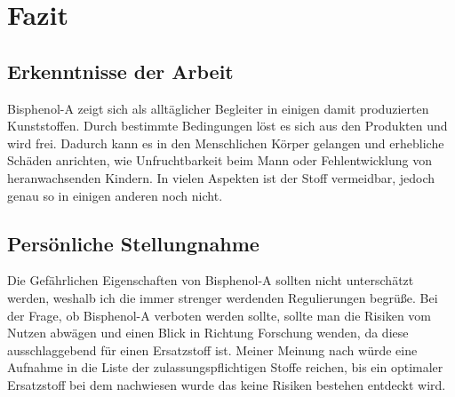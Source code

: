\section{Fazit}
\subsection{Erkenntnisse der Arbeit}
Bisphenol-A zeigt sich als alltäglicher Begleiter in einigen damit produzierten Kunststoffen. Durch bestimmte Bedingungen löst es sich aus den Produkten und wird frei. Dadurch kann es in den Menschlichen Körper gelangen und erhebliche Schäden anrichten, wie Unfruchtbarkeit beim Mann oder Fehlentwicklung von heranwachsenden Kindern. In vielen Aspekten ist der Stoff vermeidbar, jedoch genau so in einigen anderen noch nicht.
\subsection{Persönliche Stellungnahme}
Die Gefährlichen Eigenschaften von Bisphenol-A sollten nicht unterschätzt werden, weshalb ich die immer strenger werdenden Regulierungen begrüße. Bei der Frage, ob Bisphenol-A verboten werden sollte, sollte man die Risiken vom Nutzen abwägen und einen Blick in Richtung Forschung wenden, da diese ausschlaggebend für einen Ersatzstoff ist. Meiner Meinung nach würde eine Aufnahme in die Liste der zulassungspflichtigen Stoffe reichen, bis ein optimaler Ersatzstoff bei dem nachwiesen wurde das keine Risiken bestehen entdeckt wird.
